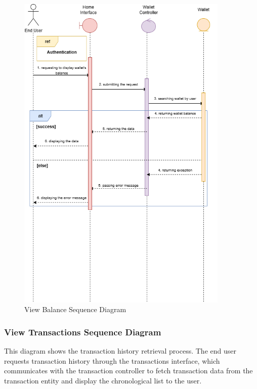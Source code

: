 \begin{figure}[H]
\centering
\includegraphics[width=0.9\textwidth]{images/seq_view_balance.png}
\caption{View Balance Sequence Diagram}
\label{fig:seq_view_balance}
\end{figure}

\subsubsection{View Transactions Sequence Diagram}

This diagram shows the transaction history retrieval process. The end user requests transaction history through the transactions interface, which communicates with the transaction controller to fetch transaction data from the transaction entity and display the chronological list to the user.

